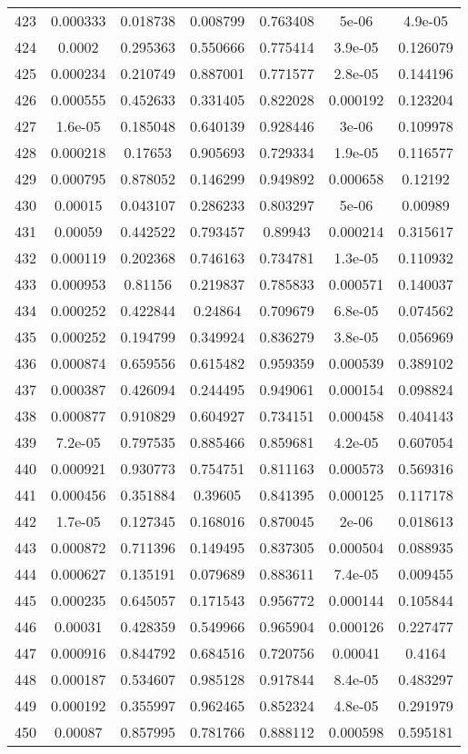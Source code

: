 \begin{table}
\begin{tabular}{c|c|c|c|c|c|c}
423 & 0.000333 & 0.018738 & 0.008799 & 0.763408 & 5e-06 & 4.9e-05\\
424 & 0.0002 & 0.295363 & 0.550666 & 0.775414 & 3.9e-05 & 0.126079\\
425 & 0.000234 & 0.210749 & 0.887001 & 0.771577 & 2.8e-05 & 0.144196\\
426 & 0.000555 & 0.452633 & 0.331405 & 0.822028 & 0.000192 & 0.123204\\
427 & 1.6e-05 & 0.185048 & 0.640139 & 0.928446 & 3e-06 & 0.109978\\
428 & 0.000218 & 0.17653 & 0.905693 & 0.729334 & 1.9e-05 & 0.116577\\
429 & 0.000795 & 0.878052 & 0.146299 & 0.949892 & 0.000658 & 0.12192\\
430 & 0.00015 & 0.043107 & 0.286233 & 0.803297 & 5e-06 & 0.00989\\
431 & 0.00059 & 0.442522 & 0.793457 & 0.89943 & 0.000214 & 0.315617\\
432 & 0.000119 & 0.202368 & 0.746163 & 0.734781 & 1.3e-05 & 0.110932\\
433 & 0.000953 & 0.81156 & 0.219837 & 0.785833 & 0.000571 & 0.140037\\
434 & 0.000252 & 0.422844 & 0.24864 & 0.709679 & 6.8e-05 & 0.074562\\
435 & 0.000252 & 0.194799 & 0.349924 & 0.836279 & 3.8e-05 & 0.056969\\
436 & 0.000874 & 0.659556 & 0.615482 & 0.959359 & 0.000539 & 0.389102\\
437 & 0.000387 & 0.426094 & 0.244495 & 0.949061 & 0.000154 & 0.098824\\
438 & 0.000877 & 0.910829 & 0.604927 & 0.734151 & 0.000458 & 0.404143\\
439 & 7.2e-05 & 0.797535 & 0.885466 & 0.859681 & 4.2e-05 & 0.607054\\
440 & 0.000921 & 0.930773 & 0.754751 & 0.811163 & 0.000573 & 0.569316\\
441 & 0.000456 & 0.351884 & 0.39605 & 0.841395 & 0.000125 & 0.117178\\
442 & 1.7e-05 & 0.127345 & 0.168016 & 0.870045 & 2e-06 & 0.018613\\
443 & 0.000872 & 0.711396 & 0.149495 & 0.837305 & 0.000504 & 0.088935\\
444 & 0.000627 & 0.135191 & 0.079689 & 0.883611 & 7.4e-05 & 0.009455\\
445 & 0.000235 & 0.645057 & 0.171543 & 0.956772 & 0.000144 & 0.105844\\
446 & 0.00031 & 0.428359 & 0.549966 & 0.965904 & 0.000126 & 0.227477\\
447 & 0.000916 & 0.844792 & 0.684516 & 0.720756 & 0.00041 & 0.4164\\
448 & 0.000187 & 0.534607 & 0.985128 & 0.917844 & 8.4e-05 & 0.483297\\
449 & 0.000192 & 0.355997 & 0.962465 & 0.852324 & 4.8e-05 & 0.291979\\
450 & 0.00087 & 0.857995 & 0.781766 & 0.888112 & 0.000598 & 0.595181\\
\end{tabular}
\end{table}
